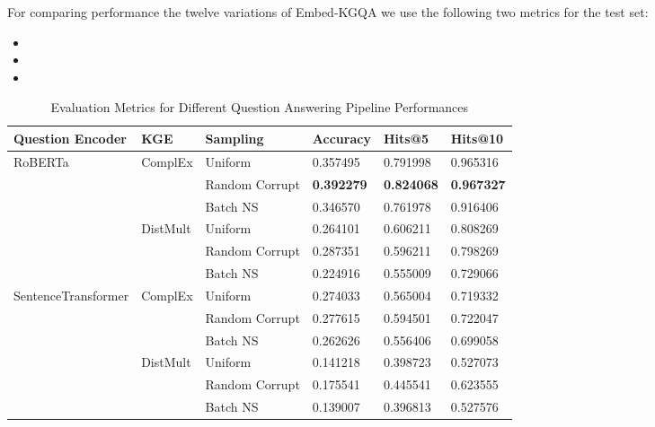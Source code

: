 \documentclass[12pt]{article}
\begin{document}
For comparing performance the twelve variations of Embed-KGQA we use the following two metrics for the test set:
\begin{itemize}
    \item {}
    \item {}
    \item {}
\end{itemize}
\sloppy
\begin{table}[htbp]
\centering
\footnotesize %
\caption{Evaluation Metrics for Different Question Answering Pipeline Performances}
\label{tab:evaluation_metrics1}
\begin{tabular}{@{}llllll@{}}
\toprule
Question Encoder & KGE & Sampling & Accuracy & Hits@5 & Hits@10 \\
\midrule
\multirow{6}{*}{RoBERTa} & \multirow{3}{*}{ComplEx} & Uniform & 0.357495 & 0.791998  & 0.965316\\
                         &                          & Random Corrupt & \textbf{0.392279} & \textbf{0.824068} & \textbf{0.967327}\\
                         &                          & Batch NS & 0.346570 & 0.761978  & 0.916406\\
\cline{2-6} %
                         & \multirow{3}{*}{DistMult} & Uniform &  0.264101 & 0.606211 & 0.808269\\ 
                         &                          & Random Corrupt &  0.287351 & 0.596211 & 0.798269\\ 
                         &                          & Batch NS & 0.224916 & 0.555009 & 0.729066\\
\midrule
\multirow{6}{*}{SentenceTransformer} & \multirow{3}{*}{ComplEx} & Uniform & 0.274033 & 0.565004& 0.719332\\
                         &                          & Random Corrupt & 0.277615 & 0.594501 & 0.722047\\
                         &                          & Batch NS & 0.262626 & 0.556406 & 0.699058\\
\cline{2-6} %
                         & \multirow{3}{*}{DistMult} & Uniform & 0.141218&0.398723&0.527073\\
                         &                          & Random Corrupt  & 0.175541&0.445541&0.623555\\
                         &                          & Batch NS & 0.139007 & 0.396813& 0.527576\\
\bottomrule
\end{tabular}
\end{table}
\sloppy
\end{document}

